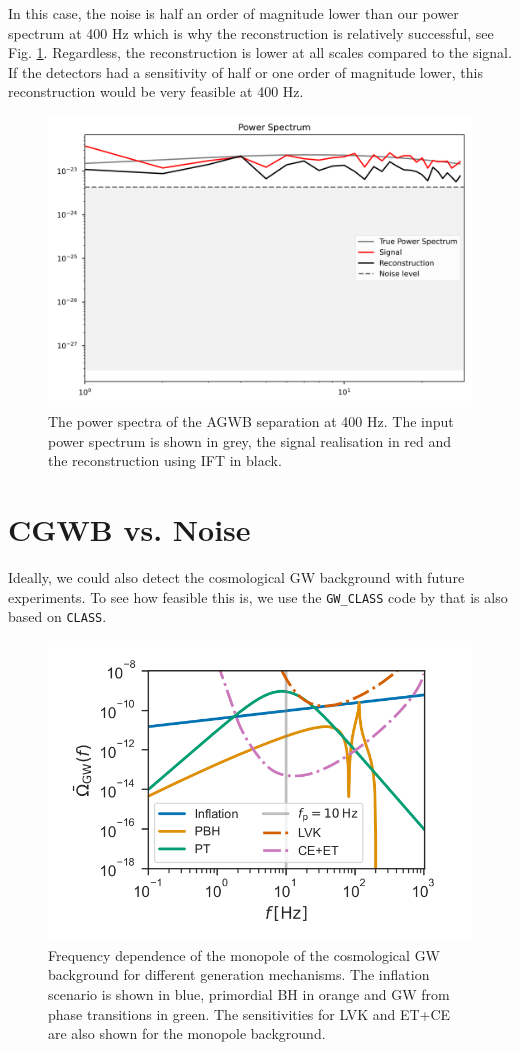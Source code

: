 In this case, the noise is half an order of magnitude lower than our power spectrum at 400 Hz which is why the reconstruction is relatively successful, see Fig. \ref{400Hz_power_spectrum}. Regardless, the reconstruction is lower at all scales compared to the signal. If the detectors had a sensitivity of half or one order of magnitude lower, this reconstruction would be very feasible at 400 Hz.

\begin{figure}[h]
    \centering
    \includegraphics[width=0.8\linewidth]{Images/power_spectrum_400Hz_2D.png}
    \caption[The power spectra of the AGWB separation at 400 Hz.]{The power spectra of the AGWB separation at 400 Hz. The input power spectrum is shown in grey, the signal realisation in red and the reconstruction using IFT in black.}
    \label{400Hz_power_spectrum}
\end{figure} 

\section{CGWB vs. Noise}

Ideally, we could also detect the cosmological GW background with future experiments. To see how feasible this is, we use the {\tt GW\_CLASS} code by \cite{schulze_gw_class_2023} that is also based on {\tt CLASS}. 
\begin{figure}[h]
    \centering
    \includegraphics[width=0.6\linewidth]{Images/schulze_monopole.png}
    \caption[Frequency dependence of the monopole of the cosmological GW background for different generation mechanisms.]{Frequency dependence of the monopole of the cosmological GW background for different generation mechanisms. The inflation scenario is shown in blue, primordial BH in orange and GW from phase transitions in green. The sensitivities for LVK and ET+CE are also shown for the monopole background.}
    \label{cosmo_monopole}
\end{figure} 

